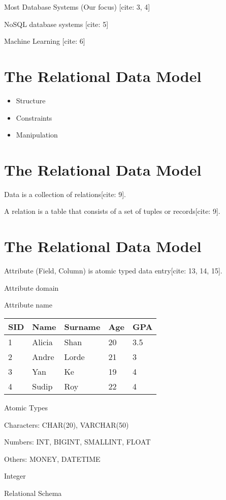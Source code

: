 \documentclass{article}
\begin{document}
Most Database Systems (Our focus) [cite: 3, 4]

NoSQL database systems [cite: 5]

Machine Learning [cite: 6]

\section*{The Relational Data Model}

\begin{itemize}
    \item Structure
    \item Constraints
    \item Manipulation
\end{itemize}

\section*{The Relational Data Model}

Data is a collection of relations[cite: 9].

A relation is a table that consists of a set of tuples or records[cite: 9].

\section*{The Relational Data Model}

Attribute (Field, Column) is atomic typed data entry[cite: 13, 14, 15].

Attribute domain

Attribute name

\begin{tabular}{lllll}
\hline
SID & Name & Surname & Age & GPA \\
\hline
1 & Alicia & Shan & 20 & 3.5 \\
2 & Andre & Lorde & 21 & 3 \\
3 & Yan & Ke & 19 & 4 \\
4 & Sudip & Roy & 22 & 4 \\
\hline
\end{tabular}

Atomic Types

Characters: CHAR(20), VARCHAR(50)

Numbers: INT, BIGINT, SMALLINT, FLOAT

Others: MONEY, DATETIME

Integer

Relational Schema
\end{document}
